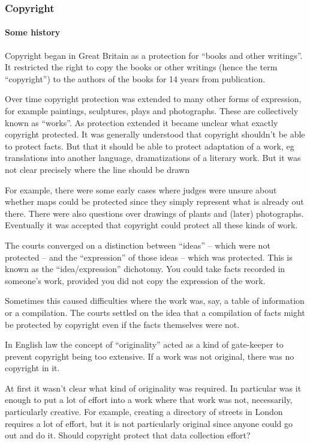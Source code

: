 \subsubsection{Copyright}\label{copyright}

\paragraph{Some history}\label{some-history}

Copyright began in Great Britain as a protection for ``books and other
writings''. It restricted the right to copy the books or other writings
(hence the term ``copyright'') to the authors of the books for 14 years
from publication.

Over time copyright protection was extended to many other forms of
expression, for example paintings, sculptures, plays and photographs.
These are collectively known as ``works''. As protection extended it
became unclear what exactly copyright protected. It was generally
understood that copyright shouldn't be able to protect facts. But that
it should be able to protect adaptation of a work, eg translations into
another language, dramatizations of a literary work. But it was not
clear precisely where the line should be drawn

For example, there were some early cases where judges were unsure about
whether maps could be protected since they simply represent what is
already out there. There were also questions over drawings of plants and
(later) photographs. Eventually it was accepted that copyright could
protect all these kinds of work.

The courts converged on a distinction between ``ideas'' -- which were
not protected -- and the ``expression'' of those ideas -- which was
protected. This is known as the ``idea/expression'' dichotomy. You could
take facts recorded in someone's work, provided you did not copy the
expression of the work.

Sometimes this caused difficulties where the work was, say, a table of
information or a compilation. The courts settled on the idea that a
compilation of facts might be protected by copyright even if the facts
themselves were not.

In English law the concept of ``originality'' acted as a kind of
gate-keeper to prevent copyright being too extensive. If a work was not
original, there was no copyright in it.

At first it wasn't clear what kind of originality was required. In
particular was it enough to put a lot of effort into a work where that
work was not, necessarily, particularly creative. For example, creating
a directory of streets in London requires a lot of effort, but it is not
particularly original since anyone could go out and do it. Should
copyright protect that data collection effort?

